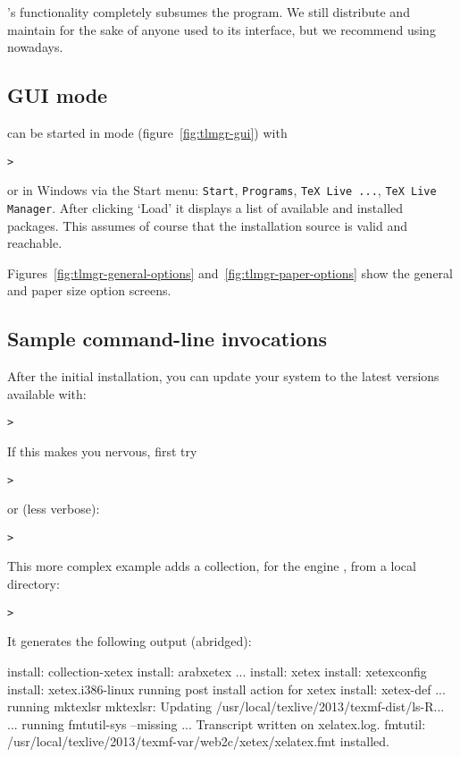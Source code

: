 \documentclass{article}
\begin{document}
's functionality completely subsumes the 
program.  We still distribute and maintain  for the sake
of anyone used to its interface, but we recommend using 
nowadays.

\subsection{ GUI mode}
 can be started in \GUI{} mode (figure~\ref{fig:tlmgr-gui}) with
\begin{alltt}
> 
\end{alltt}
or in Windows via the Start menu: \texttt{Start}, \texttt{Programs},
\texttt{TeX Live ...}, \texttt{TeX Live Manager}. After clicking `Load'
it displays a list of available and installed packages.  This assumes of
course that the installation source is valid and reachable.

Figures~\ref{fig:tlmgr-general-options} and~\ref{fig:tlmgr-paper-options}
show the general and paper size option screens.

\subsection{Sample  command-line invocations}

After the initial installation, you can update your system to the latest
versions available with:
\begin{alltt}
> 
\end{alltt}
If this makes you nervous, first try
\begin{alltt}
> 
\end{alltt}
or (less verbose):
\begin{alltt}
> 
\end{alltt}

This more complex example adds a collection, for the engine \XeTeX, from
a local directory:

\begin{alltt}
> 
\end{alltt}
It generates the following output (abridged):
\begin{fverbatim}
install: collection-xetex
install: arabxetex
...
install: xetex
install: xetexconfig
install: xetex.i386-linux
running post install action for xetex
install: xetex-def
...
running mktexlsr
mktexlsr: Updating /usr/local/texlive/2013/texmf-dist/ls-R...
...
running fmtutil-sys --missing
...
Transcript written on xelatex.log.
fmtutil: /usr/local/texlive/2013/texmf-var/web2c/xetex/xelatex.fmt installed.
\end{fverbatim}
\end{document}
